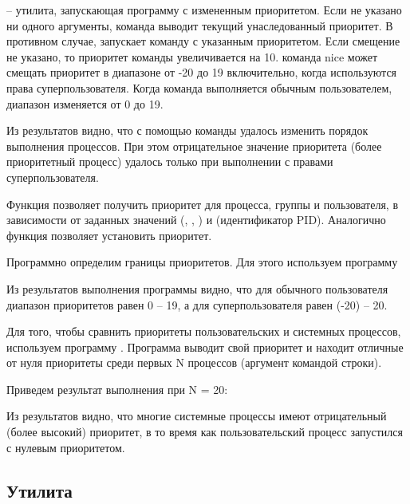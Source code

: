  -- утилита, запускающая программу с измененным приоритетом. Если не указано ни одного аргументы, команда выводит текущий унаследованный приоритет. В противном случае,  запускает команду с указанным приоритетом. Если смещение не указано, то приоритет команды увеличивается на 10. команда nice может смещать приоритет в диапазоне от -20 до 19 включительно, когда используются права суперпользователя. Когда команда выполняется обычным пользователем, диапазон изменяется от 0 до 19.

\newpage



Из результатов видно, что с помощью команды  удалось изменить порядок выполнения процессов. При этом отрицательное значение приоритета (более приоритетный процесс) удалось только при выполнении с правами суперпользователя.

Функция  позволяет получить приоритет для процесса, группы и пользователя, в зависимости от заданных значений  (, , ) и  (идентификатор PID). Аналогично функция  позволяет установить приоритет. 

Программно определим границы приоритетов. Для этого используем программу 



Из результатов выполнения программы видно, что для обычного пользователя диапазон приоритетов равен 0 -- 19, а для суперпользователя равен (-20) -- 20.


Для того, чтобы сравнить приоритеты пользовательских и системных процессов, используем программу . Программа выводит свой приоритет и находит отличные от нуля приоритеты среди первых N процессов (аргумент командой строки).



Приведем результат выполнения при N = 20:


Из результатов видно, что многие системные процессы имеют отрицательный (более высокий) приоритет, в то время как пользовательский процесс запустился с нулевым приоритетом.

\subsection{Утилита }

